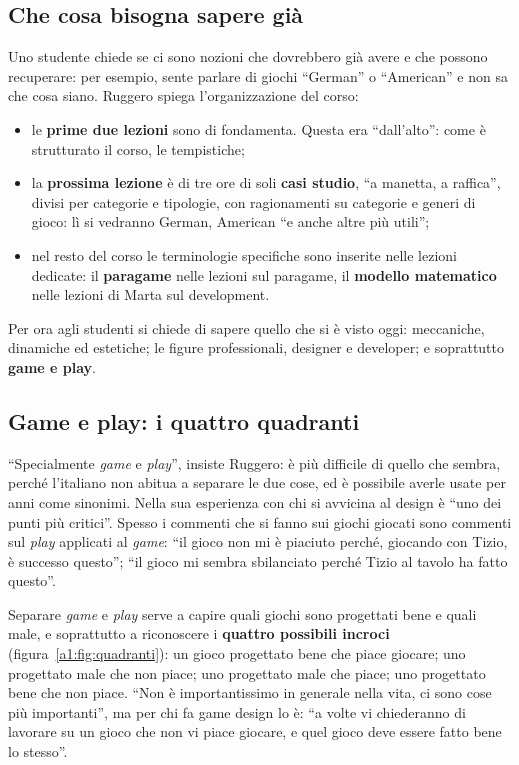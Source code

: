 \subsection{Che cosa bisogna sapere già}

Uno studente chiede se ci sono nozioni che dovrebbero già avere e che possono
recuperare: per esempio, sente parlare di giochi ``German'' o ``American'' e non
sa che cosa siano. Ruggero spiega l'organizzazione del corso:
\begin{itemize}
  \item le \textbf{prime due lezioni} sono di fondamenta. Questa era ``dall'alto'':
        come è strutturato il corso, le tempistiche;
  \item la \textbf{prossima lezione} è di tre ore di soli \textbf{casi studio},
        ``a manetta, a raffica'', divisi per categorie e tipologie, con
        ragionamenti su categorie e generi di gioco: lì si vedranno German,
        American ``e anche altre più utili'';
  \item nel resto del corso le terminologie specifiche sono inserite nelle
        lezioni dedicate: il \textbf{paragame} nelle lezioni sul paragame, il
        \textbf{modello matematico} nelle lezioni di Marta sul development.
\end{itemize}
Per ora agli studenti si chiede di sapere quello che si è visto oggi:
meccaniche, dinamiche ed estetiche; le figure professionali, designer e
developer; e soprattutto \textbf{game e play}.

\subsection{Game e play: i quattro quadranti}

``Specialmente \emph{game} e \emph{play}'', insiste Ruggero: è più difficile di
quello che sembra, perché l'italiano non abitua a separare le due cose, ed è
possibile averle usate per anni come sinonimi. Nella sua esperienza con chi si
avvicina al design è ``uno dei punti più critici''. Spesso i commenti che si
fanno sui giochi giocati sono commenti sul \emph{play} applicati al
\emph{game}: ``il gioco non mi è piaciuto perché, giocando con Tizio, è successo
questo''; ``il gioco mi sembra sbilanciato perché Tizio al tavolo ha fatto
questo''.

Separare \emph{game} e \emph{play} serve a capire quali giochi sono progettati
bene e quali male, e soprattutto a riconoscere i \textbf{quattro possibili
incroci} (figura~\ref{a1:fig:quadranti}): un gioco progettato bene che piace
giocare; uno progettato male che non piace; uno progettato male che piace; uno
progettato bene che non piace. ``Non è importantissimo in generale nella vita,
ci sono cose più importanti'', ma per chi fa game design lo è: ``a volte vi
chiederanno di lavorare su un gioco che non vi piace giocare, e quel gioco deve
essere fatto bene lo stesso''.

